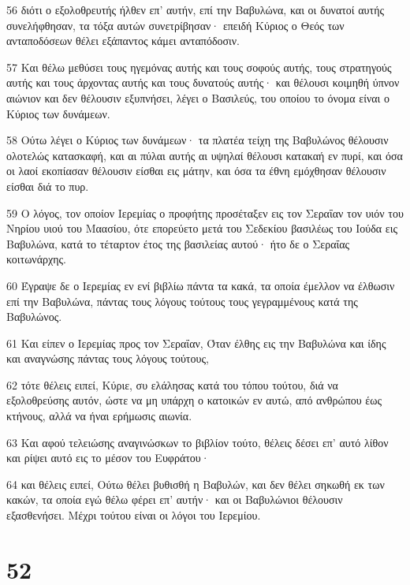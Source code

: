 \par 56 διότι ο εξολοθρευτής ήλθεν επ' αυτήν, επί την Βαβυλώνα, και οι δυνατοί αυτής συνελήφθησαν, τα τόξα αυτών συνετρίβησαν· επειδή Κύριος ο Θεός των ανταποδόσεων θέλει εξάπαντος κάμει ανταπόδοσιν.
\par 57 Και θέλω μεθύσει τους ηγεμόνας αυτής και τους σοφούς αυτής, τους στρατηγούς αυτής και τους άρχοντας αυτής και τους δυνατούς αυτής· και θέλουσι κοιμηθή ύπνον αιώνιον και δεν θέλουσιν εξυπνήσει, λέγει ο Βασιλεύς, του οποίου το όνομα είναι ο Κύριος των δυνάμεων.
\par 58 Ούτω λέγει ο Κύριος των δυνάμεων· τα πλατέα τείχη της Βαβυλώνος θέλουσιν ολοτελώς κατασκαφή, και αι πύλαι αυτής αι υψηλαί θέλουσι κατακαή εν πυρί, και όσα οι λαοί εκοπίασαν θέλουσιν είσθαι εις μάτην, και όσα τα έθνη εμόχθησαν θέλουσιν είσθαι διά το πυρ.
\par 59 Ο λόγος, τον οποίον Ιερεμίας ο προφήτης προσέταξεν εις τον Σεραΐαν τον υιόν του Νηρίου υιού του Μαασίου, ότε επορεύετο μετά του Σεδεκίου βασιλέως του Ιούδα εις Βαβυλώνα, κατά το τέταρτον έτος της βασιλείας αυτού· ήτο δε ο Σεραΐας κοιτωνάρχης.
\par 60 Έγραψε δε ο Ιερεμίας εν ενί βιβλίω πάντα τα κακά, τα οποία έμελλον να έλθωσιν επί την Βαβυλώνα, πάντας τους λόγους τούτους τους γεγραμμένους κατά της Βαβυλώνος.
\par 61 Και είπεν ο Ιερεμίας προς τον Σεραΐαν, Όταν έλθης εις την Βαβυλώνα και ίδης και αναγνώσης πάντας τους λόγους τούτους,
\par 62 τότε θέλεις ειπεί, Κύριε, συ ελάλησας κατά του τόπου τούτου, διά να εξολοθρεύσης αυτόν, ώστε να μη υπάρχη ο κατοικών εν αυτώ, από ανθρώπου έως κτήνους, αλλά να ήναι ερήμωσις αιωνία.
\par 63 Και αφού τελειώσης αναγινώσκων το βιβλίον τούτο, θέλεις δέσει επ' αυτό λίθον και ρίψει αυτό εις το μέσον του Ευφράτου·
\par 64 και θέλεις ειπεί, Ούτω θέλει βυθισθή η Βαβυλών, και δεν θέλει σηκωθή εκ των κακών, τα οποία εγώ θέλω φέρει επ' αυτήν· και οι Βαβυλώνιοι θέλουσιν εξασθενήσει. Μέχρι τούτου είναι οι λόγοι του Ιερεμίου.

\chapter{52}

